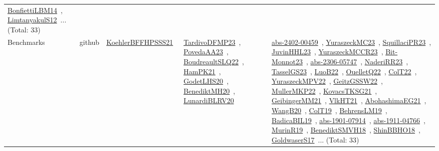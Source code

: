 {\begin{longtable}{lp{3cm}>{\raggedright\arraybackslash}p{6cm}>{\raggedright\arraybackslash}p{6cm}>{\raggedright\arraybackslash}p{8cm}}
\href{articles/BonfiettiLBM14.pdf}{BonfiettiLBM14}~\cite{BonfiettiLBM14}, \href{articles/LimtanyakulS12.pdf}{LimtanyakulS12}~\cite{LimtanyakulS12}... (Total: 33)\\
Benchmarks & github & \href{articles/KoehlerBFFHPSSS21.pdf}{KoehlerBFFHPSSS21}~\cite{KoehlerBFFHPSSS21} & \href{papers/TardivoDFMP23.pdf}{TardivoDFMP23}~\cite{TardivoDFMP23}, \href{papers/PovedaAA23.pdf}{PovedaAA23}~\cite{PovedaAA23}, \href{papers/BoudreaultSLQ22.pdf}{BoudreaultSLQ22}~\cite{BoudreaultSLQ22}, \href{articles/HamPK21.pdf}{HamPK21}~\cite{HamPK21}, \href{papers/GodetLHS20.pdf}{GodetLHS20}~\cite{GodetLHS20}, \href{articles/BenediktMH20.pdf}{BenediktMH20}~\cite{BenediktMH20}, \href{articles/LunardiBLRV20.pdf}{LunardiBLRV20}~\cite{LunardiBLRV20} & \href{articles/abs-2402-00459.pdf}{abs-2402-00459}~\cite{abs-2402-00459}, \href{papers/YuraszeckMC23.pdf}{YuraszeckMC23}~\cite{YuraszeckMC23}, \href{papers/SquillaciPR23.pdf}{SquillaciPR23}~\cite{SquillaciPR23}, \href{papers/JuvinHHL23.pdf}{JuvinHHL23}~\cite{JuvinHHL23}, \href{articles/YuraszeckMCCR23.pdf}{YuraszeckMCCR23}~\cite{YuraszeckMCCR23}, \href{papers/Bit-Monnot23.pdf}{Bit-Monnot23}~\cite{Bit-Monnot23}, \href{articles/abs-2306-05747.pdf}{abs-2306-05747}~\cite{abs-2306-05747}, \href{articles/NaderiRR23.pdf}{NaderiRR23}~\cite{NaderiRR23}, \href{papers/TasselGS23.pdf}{TasselGS23}~\cite{TasselGS23}, \href{papers/LuoB22.pdf}{LuoB22}~\cite{LuoB22}, \href{papers/OuelletQ22.pdf}{OuelletQ22}~\cite{OuelletQ22}, \href{articles/ColT22.pdf}{ColT22}~\cite{ColT22}, \href{articles/YuraszeckMPV22.pdf}{YuraszeckMPV22}~\cite{YuraszeckMPV22}, \href{papers/GeitzGSSW22.pdf}{GeitzGSSW22}~\cite{GeitzGSSW22}, \href{articles/MullerMKP22.pdf}{MullerMKP22}~\cite{MullerMKP22}, \href{papers/KovacsTKSG21.pdf}{KovacsTKSG21}~\cite{KovacsTKSG21}, \href{papers/GeibingerMM21.pdf}{GeibingerMM21}~\cite{GeibingerMM21}, \href{articles/VlkHT21.pdf}{VlkHT21}~\cite{VlkHT21}, \href{articles/AbohashimaEG21.pdf}{AbohashimaEG21}~\cite{AbohashimaEG21}, \href{papers/WangB20.pdf}{WangB20}~\cite{WangB20}, \href{papers/ColT19.pdf}{ColT19}~\cite{ColT19}, \href{papers/BehrensLM19.pdf}{BehrensLM19}~\cite{BehrensLM19}, \href{papers/BadicaBIL19.pdf}{BadicaBIL19}~\cite{BadicaBIL19}, \href{articles/abs-1901-07914.pdf}{abs-1901-07914}~\cite{abs-1901-07914}, \href{articles/abs-1911-04766.pdf}{abs-1911-04766}~\cite{abs-1911-04766}, \href{papers/MurinR19.pdf}{MurinR19}~\cite{MurinR19}, \href{papers/BenediktSMVH18.pdf}{BenediktSMVH18}~\cite{BenediktSMVH18}, \href{articles/ShinBBHO18.pdf}{ShinBBHO18}~\cite{ShinBBHO18}, \href{papers/GoldwaserS17.pdf}{GoldwaserS17}~\cite{GoldwaserS17}... (Total: 33)\\

\end{longtable}}
